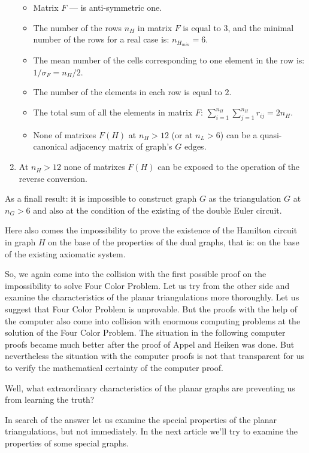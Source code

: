\documentclass{amsart}
\theoremstyle{plain}
\numberwithin{equation}{section}
\begin{document}
\begin{enumerate}
\begin {itemize}
\item 
Matrix $F$ --- is anti-symmetric one.
\item 
The number of the rows $n_H$ in matrix $F$ is equal to $3$, and the minimal number of the rows for a real case is: $n_{H_{min} }=6$.
\item 
The mean number of the cells corresponding to one element in the row is: $1/\sigma_F =n_H/2$.
\item 
The number of the elements in each row is equal to $2$. 
\item 
The total sum of all the elements in matrix $F$: $\sum_{i=1}^{n_H}\sum_{j=1}^{n_H}r_{ij}=2n_H$.
\item
None of matrixes $F(H)$ at $n_H>12$ (or at $n_L>6$) can be a quasi-canonical adjacency matrix of graph's $G$ edges.
\end {itemize}

\item 
At $n_H>12$ none of matrixes $F(H)$ can be exposed to the operation of the reverse conversion. 
\end{enumerate}

As a finall result: it is impossible to construct graph $G$ as the triangulation $G$ at $n_G>6$ and also at the condition of the existing of the double Euler circuit.

Here also comes the impossibility to prove the existence of the Hamilton circuit in graph $H$ on the base of the properties of the dual graphs, that is: on the base of the existing axiomatic system. 

So, we again come into the collision with the first possible proof on the impossibility to solve Four Color Problem. Let us try from the other side and examine the characteristics of the planar triangulations more thoroughly. Let us suggest that Four Color Problem is unprovable. But the proofs with the help of the computer also come into collision with enormous computing problems at the solution of the Four Color Problem. The situation in the following computer proofs became much better after the proof of Appel and Heiken was done. But nevertheless the situation with the computer proofs is not that transparent for us to verify the mathematical certainty of the computer proof.

Well, what extraordinary characteristics of the planar graphs are preventing us from learning the truth? 

In search of the answer let us examine the special properties of the planar triangulations, but not immediately. In the next article we'll try to examine the properties of some special graphs.
\end{document}
